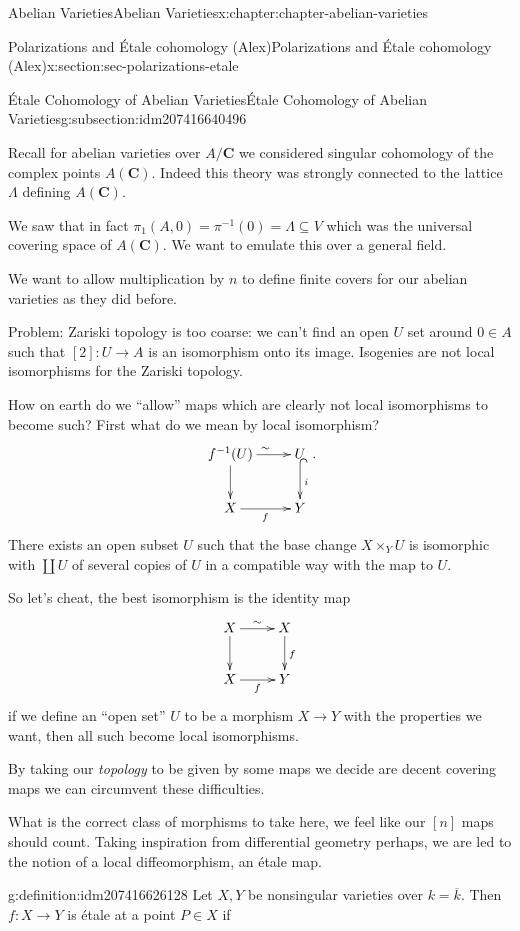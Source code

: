 \documentclass[oneside,10pt,]{book}
\numberwithin{equation}{section}
\newcommand{\lb}{[}
\newcommand{\rb}{]}
\newcommand{\CC}{\mathbf{C}}
\begin{document}
\begin{chapterptx}{Abelian Varieties}{}{Abelian Varieties}{}{}{x:chapter:chapter-abelian-varieties}
\begin{sectionptx}{Polarizations and Étale cohomology (Alex)}{}{Polarizations and Étale cohomology (Alex)}{}{}{x:section:sec-polarizations-etale}
\begin{subsectionptx}{Étale Cohomology of Abelian Varieties}{}{Étale Cohomology of Abelian Varieties}{}{}{g:subsection:idm207416640496}
\par
Recall for abelian varieties over \(A/\CC\) we considered singular cohomology of the complex points \(A(\CC)\). Indeed this theory was strongly connected to the lattice \(\Lambda\) defining \(A(\CC)\).%
\par
We saw that in fact \(\pi_1(A,0) = \pi^{-1} (0) = \Lambda \subseteq V\) which was the universal covering space of \(A(\CC)\). We want to emulate this over a general field.%
\par
We want to allow multiplication by \(n\) to define finite covers for our abelian varieties as they did before.%
\par
Problem: Zariski topology is too coarse: we can't find an open \(U\) set around \(0 \in A\) such that \(\lb 2\rb \colon U \to A\) is an isomorphism onto its image. Isogenies are not local isomorphisms for the Zariski topology.%
\par
How on earth do we ``allow'' maps which are clearly not local isomorphisms to become such? First what do we mean by local isomorphism?%
\begin{equation*}
\xymatrix{
f^{-1}(U)\ar[d] \ar[r]^{\sim} & U\ar@{^(->}[d]^i\\
X \ar[r]_f & Y
}\text{.}
\end{equation*}
There exists an open subset \(U\) such that the base change \(X \times_Y U\) is isomorphic with \(\coprod U\) of several copies of \(U\) in a compatible way with the map to \(U\).%
\par
So let's cheat, the best isomorphism is the identity map%
\begin{equation*}
\xymatrix{
X\ar[d] \ar[r]^{\sim} & X\ar[d]^f\\
X \ar[r]_f & Y
}
\end{equation*}
if we define an ``open set'' \(U\) to be a morphism \(X \to Y\) with the properties we want, then all such become local isomorphisms.%
\par
By taking our \emph{topology} to be given by some maps we decide are decent covering maps we can circumvent these difficulties.%
\par
What is the correct class of morphisms to take here, we feel like our \(\lb n\rb\) maps should count. Taking inspiration from differential geometry perhaps, we are led to the notion of a local diffeomorphism, an étale map.%
\begin{definition}{}{g:definition:idm207416626128}%
Let \(X,Y\) be nonsingular varieties over \(k = \overline k\). Then \(f\colon X\to Y\) is étale at a point \(P\in X\) if%

\end{definition}
\end{subsectionptx}
\end{sectionptx}
\end{chapterptx}
\end{document}
